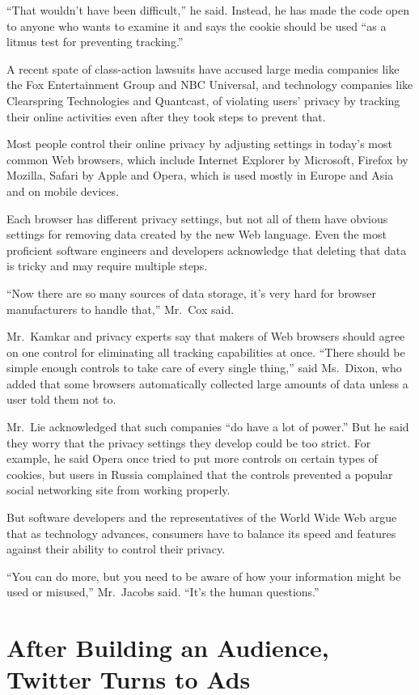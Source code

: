﻿\documentclass[12pt]{article}
\begin{document}
``That wouldn't have been difficult,'' he said. Instead, he has made the code open to anyone who
wants to examine it and says the cookie should be used ``as a litmus test for preventing tracking.''

A recent spate of class-action lawsuits have accused large media companies like the Fox
Entertainment Group and NBC Universal, and technology companies like Clearspring Technologies and
Quantcast, of violating users' privacy by tracking their online activities even after they took
steps to prevent that.

Most people control their online privacy by adjusting settings in today's most common Web browsers,
which include Internet Explorer by Microsoft, Firefox by Mozilla, Safari by Apple and Opera, which
is used mostly in Europe and Asia and on mobile devices.

Each browser has different privacy settings, but not all of them have obvious settings for removing
data created by the new Web language. Even the most proficient software engineers and developers
acknowledge that deleting that data is tricky and may require multiple steps.

``Now there are so many sources of data storage, it's very hard for browser manufacturers to handle
that,'' Mr.~Cox said.

Mr.~Kamkar and privacy experts say that makers of Web browsers should agree on one control for
eliminating all tracking capabilities at once. ``There should be simple enough controls to take care
of every single thing,'' said Ms.~Dixon, who added that some browsers automatically collected large
amounts of data unless a user told them not to.

Mr.~Lie acknowledged that such companies ``do have a lot of power.'' But he said they worry that the
privacy settings they develop could be too strict. For example, he said Opera once tried to put more
controls on certain types of cookies, but users in Russia complained that the controls prevented a
popular social networking site from working properly.

But software developers and the representatives of the World Wide Web argue that as technology
advances, consumers have to balance its speed and features against their ability to control their
privacy.

``You can do more, but you need to be aware of how your information might be used or misused,''
Mr.~Jacobs said. ``It's the human questions.''

\section{After Building an Audience, Twitter Turns to Ads}
\end{document}
